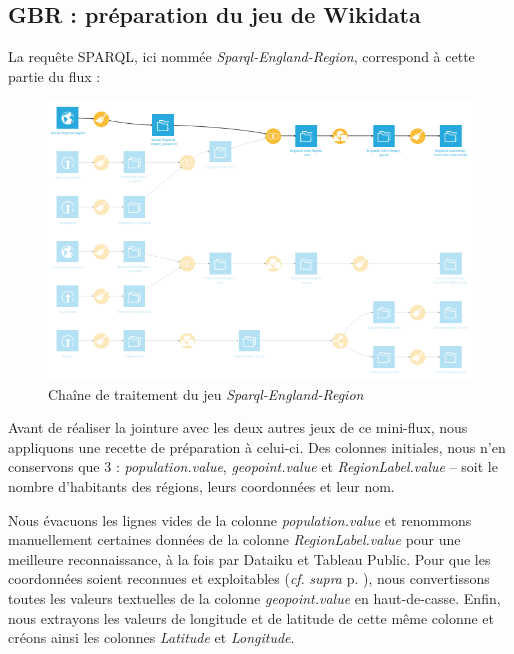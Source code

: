 \documentclass[hidelinks, 12pt]{report}
\begin{document}
%





\subsection{GBR : préparation du jeu de Wikidata}

La requête SPARQL, ici nommée \textit{Sparql-England-Region}, correspond à cette partie du flux :

\begin{center}
	\begin{figure}[H]
		\setlength{\belowcaptionskip}{-35pt}
		\includegraphics[scale=0.55]{images/flow-swim-eng-sparql.png}
		\caption{Chaîne de traitement du jeu \textit{Sparql-England-Region}}
	\end{figure}
\end{center}

Avant de réaliser la jointure avec les deux autres jeux de ce mini-flux, nous appliquons une recette de préparation à celui-ci. Des colonnes initiales, nous n'en conservons que 3 : \textit{population.value}, \textit{geopoint.value} et \textit{RegionLabel.value} -- soit le nombre d'habitants des régions, leurs coordonnées et leur nom.

Nous évacuons les lignes vides de la colonne \textit{population.value} et renommons manuellement certaines données de la colonne \textit{RegionLabel.value} pour une meilleure reconnaissance, à la fois par Dataiku et Tableau Public. Pour que les coordonnées soient reconnues et exploitables (\textit{cf}. \textit{supra} p. \pageref{casse}), nous convertissons toutes les valeurs textuelles de la colonne \textit{geopoint.value} en haut-de-casse. Enfin, nous extrayons les valeurs de longitude et de latitude de cette même colonne et créons ainsi les colonnes \textit{Latitude} et \textit{Longitude}.
\end{document}
